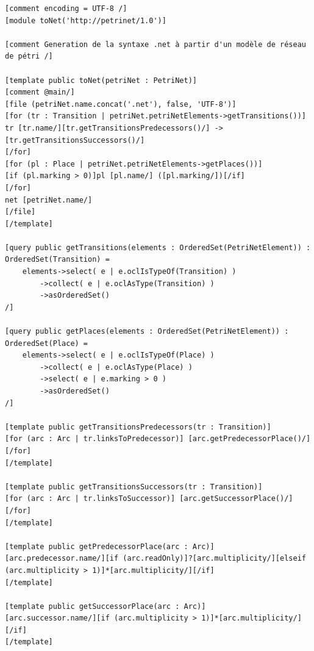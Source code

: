 \begin{lstlisting}[caption=toNet.mtl]
[comment encoding = UTF-8 /]
[module toNet('http://petrinet/1.0')]

[comment Generation de la syntaxe .net à partir d'un modèle de réseau de pétri /]

[template public toNet(petriNet : PetriNet)]
[comment @main/]
[file (petriNet.name.concat('.net'), false, 'UTF-8')]
[for (tr : Transition | petriNet.petriNetElements->getTransitions())]
tr [tr.name/][tr.getTransitionsPredecessors()/] ->[tr.getTransitionsSuccessors()/]
[/for]
[for (pl : Place | petriNet.petriNetElements->getPlaces())]
[if (pl.marking > 0)]pl [pl.name/] ([pl.marking/])[/if]
[/for]
net [petriNet.name/]
[/file]
[/template]

[query public getTransitions(elements : OrderedSet(PetriNetElement)) : OrderedSet(Transition) = 
	elements->select( e | e.oclIsTypeOf(Transition) )
		->collect( e | e.oclAsType(Transition) )
		->asOrderedSet()
/]

[query public getPlaces(elements : OrderedSet(PetriNetElement)) : OrderedSet(Place) = 
	elements->select( e | e.oclIsTypeOf(Place) )
		->collect( e | e.oclAsType(Place) )
		->select( e | e.marking > 0 )
		->asOrderedSet()
/]

[template public getTransitionsPredecessors(tr : Transition)]
[for (arc : Arc | tr.linksToPredecessor)] [arc.getPredecessorPlace()/][/for]
[/template]

[template public getTransitionsSuccessors(tr : Transition)]
[for (arc : Arc | tr.linksToSuccessor)] [arc.getSuccessorPlace()/][/for]
[/template]

[template public getPredecessorPlace(arc : Arc)]
[arc.predecessor.name/][if (arc.readOnly)]?[arc.multiplicity/][elseif (arc.multiplicity > 1)]*[arc.multiplicity/][/if]
[/template]

[template public getSuccessorPlace(arc : Arc)]
[arc.successor.name/][if (arc.multiplicity > 1)]*[arc.multiplicity/][/if]
[/template]
\end{lstlisting}

